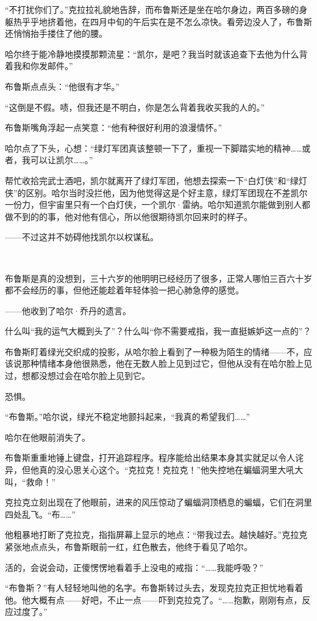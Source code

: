 \documentclass[../main]{subfiles}
\begin{document}
“不打扰你们了。”克拉拉礼貌地告辞，而布鲁斯还是坐在哈尔身边，两百多磅的身躯热乎乎地挤着他，在四月中旬的午后实在是不怎么凉快。看旁边没人了，布鲁斯还悄悄抬手搂住了他的腰。

哈尔终于能冷静地摸摸那颗流星：“凯尔，是吧？我当时就该追查下去他为什么背着我和你发邮件。”

布鲁斯点点头：“他很有才华。”

“这倒是不假。啧，但我还是不明白，你是怎么背着我收买我的人的。”

布鲁斯嘴角浮起一点笑意：“他有种很好利用的浪漫情怀。”

哈尔点了下头，心想：“绿灯军团真该整顿一下了，重视一下脚踏实地的精神……或者，我可以让凯尔……。”

帮忙收拾完武士酒吧，凯尔就离开了绿灯军团，他想去探索一下“白灯侠”和“绿灯侠”的区别。哈尔当时没拦他，因为他觉得这是个好主意，绿灯军团现在不差凯尔一份力，但宇宙里只有一个白灯侠，一个凯尔·雷纳。哈尔知道凯尔能做到别人都做不到的的事，他对他有信心，所以他很期待凯尔回来时的样子。

——不过这并不妨碍他找凯尔以权谋私。

~\

布鲁斯是真的没想到，三十六岁的他明明已经经历了很多，正常人哪怕三百六十岁都不会经历的事，但他还能趁着年轻体验一把心肺急停的感觉。

——他收到了哈尔·乔丹的遗言。

什么叫“我的运气大概到头了”？什么叫“你不需要戒指，我一直挺嫉妒这一点的”？

布鲁斯盯着绿光交织成的投影，从哈尔脸上看到了一种极为陌生的情绪——不，应该说那种情绪本身他很熟悉，他在无数人脸上见到过它，但他从没有在哈尔脸上见过，想都没想过会在哈尔脸上见到它。

恐惧。

“布鲁斯。”哈尔说，绿光不稳定地颤抖起来，“我真的希望我们……”

哈尔在他眼前消失了。

布鲁斯重重地锤上键盘，打开追踪程序。程序能给出结果本身其实就足以令人诧异，但他真的没心思关心这个。“克拉克！克拉克！”他失控地在蝙蝠洞里大吼大叫，“救命！”

克拉克立刻出现在了他眼前，进来的风压惊动了蝙蝠洞顶栖息的蝙蝠，它们在洞里四处乱飞。“布……”

他粗暴地打断了克拉克，指指屏幕上显示的地点：“带我过去。越快越好。”克拉克紧张地点点头，布鲁斯眼前一红，红色散去，他终于看见了哈尔。

活的，会说会动，正傻愣愣地看着手上没电的戒指：“……我能呼吸？”

“布鲁斯？”有人轻轻地叫他的名字。布鲁斯转过头去，发现克拉克正担忧地看着他。他大概有点——好吧，不止一点——吓到克拉克了。“……抱歉，刚刚有点，反应过度了。”
\end{document}
